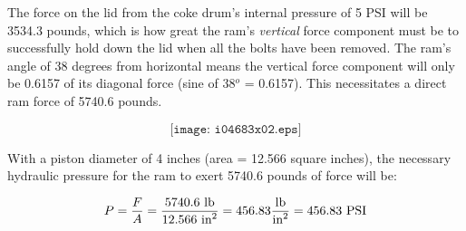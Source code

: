 





The force on the lid from the coke drum's internal pressure of 5 PSI will be 3534.3 pounds, which is how great the ram's {\it vertical} force component must be to successfully hold down the lid when all the bolts have been removed.  The ram's angle of 38 degrees from horizontal means the vertical force component will only be 0.6157 of its diagonal force (sine of 38$^{o}$ = 0.6157).  This necessitates a direct ram force of 5740.6 pounds.

$$\texttt{[image: i04683x02.eps]}$$

With a piston diameter of 4 inches (area = 12.566 square inches), the necessary hydraulic pressure for the ram to exert 5740.6 pounds of force will be:

$$P = {F \over A} = {5740.6 \hbox{ lb} \over 12.566 \hbox{ in}^2} = 456.83 {\hbox{lb} \over \hbox{in}^2} = 456.83 \hbox{ PSI}$$



